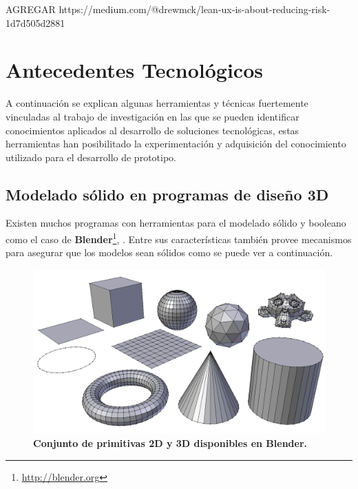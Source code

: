 AGREGAR https://medium.com/@drewmck/lean-ux-is-about-reducing-risk-1d7d505d2881


\clearpage

\section{Antecedentes Tecnológicos}

A continuación se explican algunas herramientas y técnicas fuertemente vinculadas al trabajo de investigación en las que se pueden identificar conocimientos aplicados al desarrollo de soluciones tecnológicas, estas herramientas han posibilitado la experimentación y adquisición del conocimiento utilizado para el desarrollo de prototipo.

\subsection{Modelado sólido en programas de diseño 3D}
Existen muchos programas con herramientas para el modelado sólido y booleano como el caso de \textbf{Blender}\footnote{\url{http://blender.org}},  \citep{BlenderFoundation}. 
Entre sus características también provee mecanismos para asegurar que los modelos sean sólidos como se puede ver a continuación.

\begin{figure}[h]
\includegraphics[width=14cm]{Img/GEO/geo-blender.png}
\centering
\caption{\textbf{ \footnotesize{Conjunto de primitivas 2D y 3D disponibles en Blender.}}}
\end{figure}


